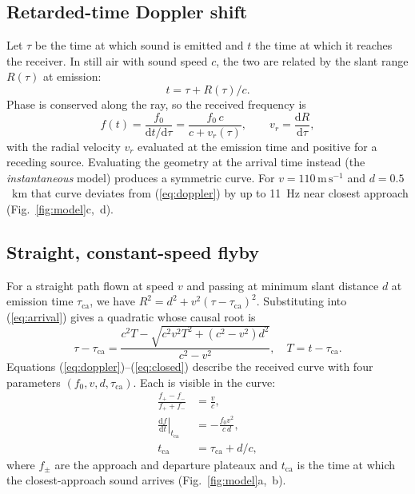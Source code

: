 \documentclass[10pt,twocolumn,letterpaper]{article}
\newcommand{\dd}{\mathrm{d}}
\newcommand{\ca}{\mathrm{ca}}
\newcommand{\ms}{\ensuremath{\,\mathrm{m\,s^{-1}}}}
\begin{document}
\subsection{Retarded-time Doppler shift}
Let $\tau$ be the time at which sound is emitted and $t$ the time at which it reaches the receiver. In still air with
sound speed $c$, the two are related by the slant range $R(\tau)$ at emission:
\begin{equation}
t = \tau + R(\tau)/c .\label{eq:arrival}
\end{equation}
Phase is conserved along the ray, so the received frequency is
\begin{equation}
f(t) = \frac{f_0}{\dd t/\dd\tau} = \frac{f_0\, c}{c + v_r(\tau)}, \qquad v_r = \frac{\dd R}{\dd\tau},\label{eq:doppler}
\end{equation}
with the radial velocity $v_r$ evaluated at the emission time and positive for a receding source. Evaluating the
geometry at the arrival time instead (the \emph{instantaneous} model) produces a symmetric curve. For
$v=110\ms$ and $d=0.5$~km that curve deviates from (\ref{eq:doppler}) by up to 11~Hz near closest approach
(Fig.~\ref{fig:model}c,~d).

\subsection{Straight, constant-speed flyby}
For a straight path flown at speed $v$ and passing at minimum slant distance $d$ at emission time $\tau_\ca$, we
have $R^2 = d^2 + v^2(\tau-\tau_\ca)^2$. Substituting into (\ref{eq:arrival}) gives a quadratic whose causal root is
\begin{equation}
\tau-\tau_\ca = \frac{c^2T-\sqrt{c^2v^2T^2+(c^2-v^2)d^2}}{c^2-v^2}, \quad T = t-\tau_\ca .\label{eq:closed}
\end{equation}
Equations (\ref{eq:doppler})--(\ref{eq:closed}) describe the received curve with four parameters
$(f_0, v, d, \tau_\ca)$. Each is visible in the curve:
\begin{subequations}\label{eq:observables}
\begin{align}
\frac{f_+-f_-}{f_++f_-} &= \frac{v}{c}, \label{eq:obs-v}\\
\left.\frac{\dd f}{\dd t}\right|_{t_\ca} &= -\frac{f_0 v^2}{c\,d}, \label{eq:obs-d}\\
t_\ca &= \tau_\ca + d/c, \label{eq:obs-t}
\end{align}
\end{subequations}
where $f_\pm$ are the approach and departure plateaux and $t_\ca$ is the time at which the closest-approach sound
arrives (Fig.~\ref{fig:model}a,~b).
\end{document}
